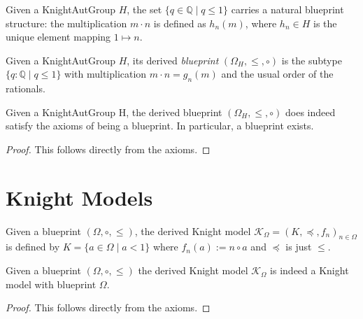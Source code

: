 Given a KnightAutGroup $H$, the set $\{q \in \mathbb{Q} \mid q \le 1\}$ carries a natural blueprint structure: the multiplication $m \cdot n$ is defined as $h_n(m)$, where $h_n \in H$ is the unique element mapping $1 \mapsto n$.

\begin{definition}
  \label{def:knight-aut-group-blueprint}
  \leanok
  Given a KnightAutGroup $H$, its derived \emph{blueprint} $(\Omega_H, \le, \circ)$ is the subtype $\{q : \mathbb{Q} \mid q \le 1\}$ with multiplication $m \cdot n = g_n(m)$ and the usual order of the rationals.
\end{definition}

\begin{theorem}
  \label{thm:knight-aut-group-is-blueprint}
  \leanok
  Given a KnightAutGroup H, the derived blueprint $(\Omega_H, \le, \circ)$ does indeed satisfy the axioms of being a blueprint.
  In particular, a blueprint exists.
\end{theorem}

\begin{proof}
  \leanok
  This follows directly from the axioms.
\end{proof}


\section{Knight Models}\label{sec:knight-model}

\begin{definition}
  \label{def:knight-model-blueprint}
  \leanok
  Given a blueprint $(\Omega, \circ, \le)$, the derived Knight model $\mathcal{K}_\Omega = (K, \preceq, f_n)_{n \in \Omega}$ is defined by $K = \{a \in \Omega \mid a < 1\}$ where $f_n(a) := n \circ a$ and $\preceq$ is just $\le$.
\end{definition}

\begin{theorem}
  \label{thm:blueprint-is-knight-model}
  \leanok
  Given a blueprint $(\Omega, \circ, \le)$ the derived Knight model $\mathcal{K}_\Omega$ is indeed a Knight model with blueprint $\Omega$.
\end{theorem}

\begin{proof}
  \leanok
  This follows directly from the axioms.
\end{proof}



